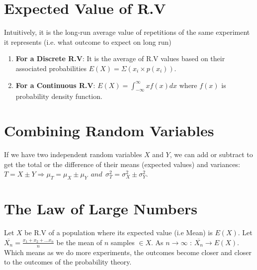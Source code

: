 \documentclass[11pt, twocolumn]{article}
\begin{document}
\section{Expected Value of R.V}
Intuitively, it is the long-run average value of repetitions of the same experiment it represents (i.e. what outcome to expect on long run)
\begin{enumerate}
\item \textbf{For a Discrete R.V}: It is the average of R.V values based on their associated probabilities $E(X) = \Sigma (x_i \times p(x_i))$.
\item \textbf{For a Continuous R.V}: $E(X) = \int_{-\infty}^{\infty} x f(x) dx$ where $f(x)$ is probability density function.
\end{enumerate}

\section{Combining Random Variables}
If we have two independent random variables $X$ and $Y$, we can add or subtract to get the total or the difference of their means (expected values) and variances:
$T = X \pm Y \Rightarrow \mu_T = \mu_X \pm \mu_Y  ~~ and ~~ \sigma_T^2 = \sigma_X^2 \pm \sigma_Y^2$.

\section{The Law of Large Numbers}
Let $X$ be R.V of a population where its expected value (i.e Mean) is $E(X)$. Let $\overline{X_n} = \frac{x_1 + x_2 + ... x_n}{n}$ be the mean of $n$ samples $\in X$. As $n \to \infty$ : $\overline{X_n} \to E(X)$. Which means as we do more experiments, the outcomes become closer and closer to the outcomes of the probability theory.
\end{document}
